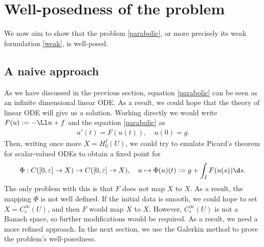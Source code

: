 \documentclass[
    a4paper,
    DIV=14,
    abstract=true,
    numbers=noenddot
]{scrartcl}
\begin{document}
\section{Well-posedness of the problem}
We now aim to show that the problem \eqref{parabolic}, or more precisely its weak formulation \eqref{weak}, is well-posed.
\subsection{A naive approach}
As we have discussed in the previous section, equation \eqref{parabolic} can be seen as an infinite dimensional linear ODE. As a result, we could hope that the theory of linear ODE will give us a solution. Working directly we would write  $F(u):= -\Ll u + f$ and the equation \eqref{parabolic} as
\begin{align}\label{ode}
 u'(t)= F(u(t)), \quad u(0) = g.
\end{align}
Then, writing once more $X =H_0^1(U)$, we could try to emulate Picard's theorem for scalar-valued ODEs to obtain a fixed point for
\begin{align*}
  \Phi: C([0,\varepsilon ] \to X) \to C([0,\varepsilon ] \to X), \quad u \mapsto \Phi(u)(t) := g + \int_I F(u(s)) \d s.
\end{align*}
The only problem with this is that $F$ does not map $X$ to $X$. As a result, the mapping $\Phi$ is not well defined. If the initial data is smooth, we could hope to set $X = C_c^\infty(U)$, and then $F$ would map $X$ to $X$. However, $C^\infty_c(U)$ is not a Banach space, so further modifications would be required.
As a result, we need a more refined approach. In the next section, we use the Galerkin method to prove the problem's well-posedness.
\end{document}
